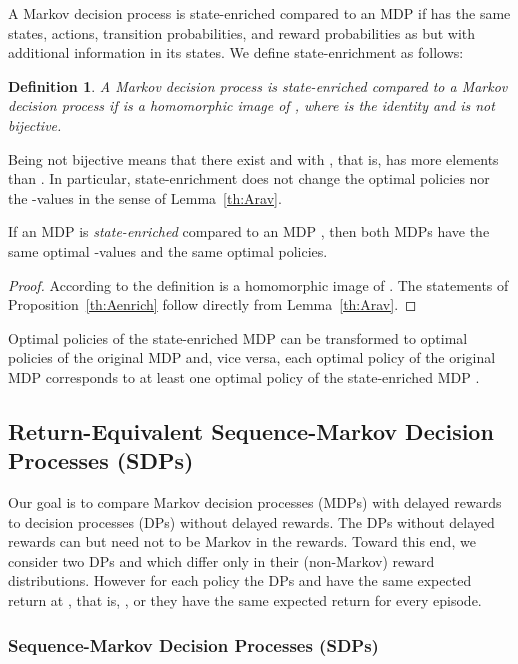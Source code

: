 \documentclass{article}
\newtheorem{definitionA}{Definition}
\begin{document}
\begin{appendices}
A Markov decision process  is state-enriched compared to
an MDP  if  has the same states, actions, transition
probabilities, and reward probabilities as
 but with additional information in its states.
We define state-enrichment as follows:
\begin{definitionA}
  A Markov decision process  is {\em state-enriched} compared to
  a Markov decision process  if  is a homomorphic image of
  , where  is the identity and 
   is not bijective. 
\end{definitionA}
Being not bijective means that there exist 
and  with , that is, 
 has more elements than .
In particular, state-enrichment does not change the optimal policies nor
the -values in the sense of Lemma~\ref{th:Arav}.
\begin{propositionA}
\label{th:Aenrich}
If an MDP  is {\em state-enriched} compared to
an MDP , then both MDPs have the same 
optimal -values and the same optimal policies. 
\end{propositionA}
\begin{proof}
According to the definition  is a homomorphic image of
. The statements of Proposition~\ref{th:Aenrich} 
follow directly from Lemma~\ref{th:Arav}.
\end{proof}
Optimal policies of the 
state-enriched MDP 
can be transformed to optimal policies of the original MDP  
and, vice versa, 
each optimal policy of the original MDP  
corresponds to at least one optimal
policy of the state-enriched MDP .

\subsection{Return-Equivalent Sequence-Markov Decision Processes (SDPs)}
\label{sec:AReturnEquivalent}

Our goal is to compare Markov decision processes (MDPs)
with delayed rewards to decision processes (DPs) without delayed rewards.
The DPs without delayed rewards can but need not to be Markov in the rewards.
Toward this end, we consider two DPs  and  which
differ only in their (non-Markov) reward distributions. 
However for each policy  the DPs  and 
have the same expected return at , 
that is, , 
or they have the same expected return for every episode.

\subsubsection{Sequence-Markov Decision Processes (SDPs)}
\label{sec:Asdps}


\end{appendices}
\end{document}
